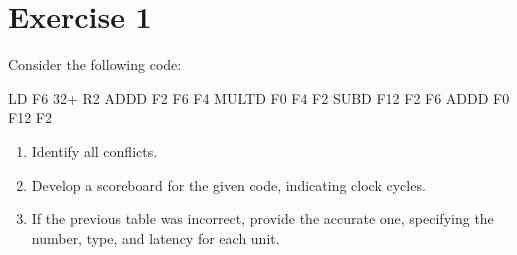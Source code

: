 \section{Exercise 1}

Consider the following code:
\begin{verbnobox}[\verbarg]
LD F6 32+ R2
ADDD F2 F6 F4
MULTD F0 F4 F2
SUBD F12 F2 F6
ADDD F0 F12 F2
\end{verbnobox}
\begin{enumerate}
    \item Identify all conflicts.
    \item Develop a scoreboard for the given code, indicating clock cycles.
    \item If the previous table was incorrect, provide the accurate one, specifying the number, type, and latency for each unit.
\end{enumerate}

